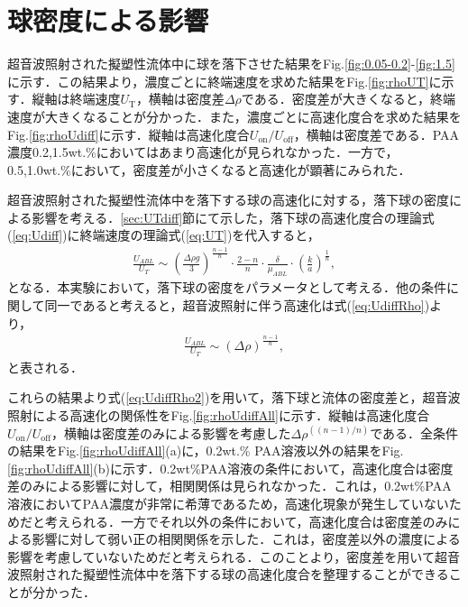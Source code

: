 \section{球密度による影響}

超音波照射された擬塑性流体中に球を落下させた結果をFig.\ref{fig:0.05-0.2}-\ref{fig:1.5}に示す．この結果より，濃度ごとに終端速度を求めた結果をFig.\ref{fig:rhoUT}に示す．縦軸は終端速度$U_\text{T}$，横軸は密度差$\Delta\rho$である．密度差が大きくなると，終端速度が大きくなることが分かった．また，濃度ごとに高速化度合を求めた結果をFig.\ref{fig:rhoUdiff}に示す．縦軸は高速化度合$U_\text{on}/U_\text{off}$，横軸は密度差である．PAA濃度0.2,1.5wt.\%においてはあまり高速化が見られなかった．一方で，0.5,1.0wt.\%において，密度差が小さくなると高速化が顕著にみられた．

超音波照射された擬塑性流体中を落下する球の高速化に対する，落下球の密度による影響を考える．\ref{sec:UTdiff}節にて示した，落下球の高速化度合の理論式(\ref{eq:Udiff})に終端速度の理論式(\ref{eq:UT})を代入すると，
\begin{eqnarray}
    \frac{U_{ABL}}{U_T} \sim \left(\frac{\Delta\rho{}g}{3}\right)^{\frac{n-1}{n}}\cdot\frac{2-n}{n}\cdot\frac{\delta}{\mu_{ABL}}\cdot\left(\frac{k}{a}\right)^{\frac{1}{n}} ,
    \label{eq:UdiffRho}
\end{eqnarray}
となる．本実験において，落下球の密度をパラメータとして考える．他の条件に関して同一であると考えると，超音波照射に伴う高速化は式(\ref{eq:UdiffRho})より，
\begin{eqnarray}
    \frac{U_{ABL}}{U_T} \sim \left(\Delta\rho{}\right)^{\frac{n-1}{n}} ,
    \label{eq:UdiffRho2}
\end{eqnarray}
と表される．

これらの結果より式(\ref{eq:UdiffRho2})を用いて，落下球と流体の密度差と，超音波照射による高速化の関係性をFig.\ref{fig:rhoUdiffAll}に示す．縦軸は高速化度合$U_\text{on}/U_\text{off}$，横軸は密度差のみによる影響を考慮した$\Delta\rho^{\left(\left(n-1\right)/n\right)}$である．全条件の結果をFig.\ref{fig:rhoUdiffAll}(a)に，0.2wt.\% PAA溶液以外の結果をFig.\ref{fig:rhoUdiffAll}(b)に示す．0.2wt\%PAA溶液の条件において，高速化度合は密度差のみによる影響に対して，相関関係は見られなかった．これは，0.2wt\%PAA溶液においてPAA濃度が非常に希薄であるため，高速化現象が発生していないためだと考えられる．一方でそれ以外の条件において，高速化度合は密度差のみによる影響に対して弱い正の相関関係を示した．これは，密度差以外の濃度による影響を考慮していないためだと考えられる．このことより，密度差を用いて超音波照射された擬塑性流体中を落下する球の高速化度合を整理することができることが分かった．

